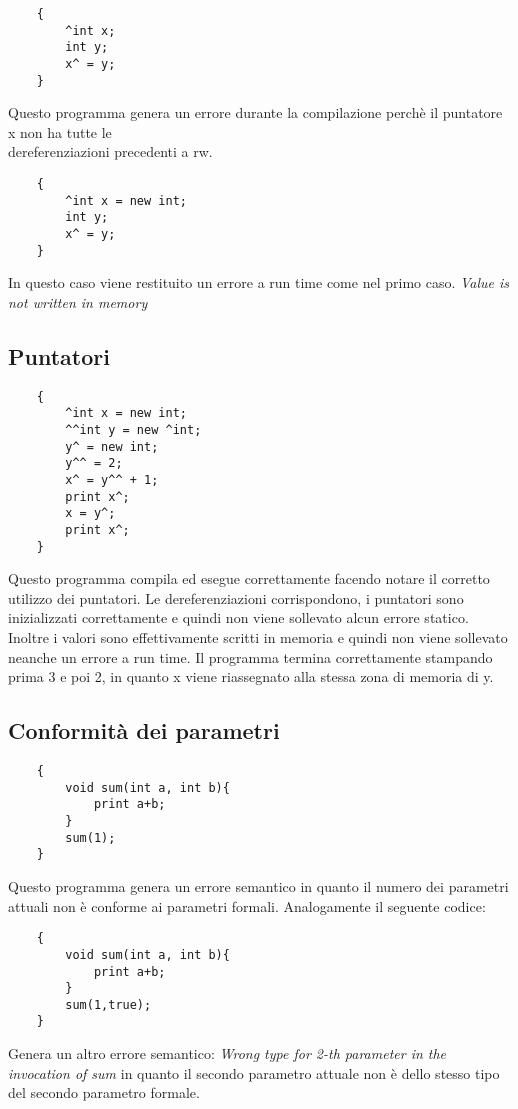 \documentclass[../../main]{subfiles}
\begin{document}
\begin{lstlisting}
    {
        ^int x;
        int y;
        x^ = y;
    }
\end{lstlisting}
Questo programma genera un errore durante la compilazione perchè il puntatore x non ha tutte le \\ dereferenziazioni
precedenti a rw.

\begin{lstlisting}
    {
        ^int x = new int;
        int y;
        x^ = y;
    }

\end{lstlisting}
In questo caso viene restituito un errore a run time come nel primo caso.
\textit{Value is not written in memory}

\subsection{Puntatori}
\begin{lstlisting}
    {
        ^int x = new int;
        ^^int y = new ^int;
        y^ = new int;
        y^^ = 2;
        x^ = y^^ + 1;
        print x^;
        x = y^;
        print x^;
    }
\end{lstlisting}
Questo programma compila ed esegue correttamente facendo notare il corretto utilizzo dei puntatori.
Le dereferenziazioni corrispondono, i puntatori sono inizializzati correttamente e quindi non viene sollevato 
alcun errore statico. Inoltre i valori sono effettivamente scritti in memoria e quindi non viene sollevato neanche un errore
a run time. Il programma termina correttamente stampando prima 3 e poi 2, in quanto x viene riassegnato alla stessa zona di memoria di y.

\subsection{Conformità dei parametri}
\begin{lstlisting}
    {
        void sum(int a, int b){
            print a+b;
        }
        sum(1);
    }
\end{lstlisting}
Questo programma genera un errore semantico in quanto il numero dei parametri attuali non è conforme ai parametri formali.
Analogamente il seguente codice:
\begin{lstlisting}
    {
        void sum(int a, int b){
            print a+b;
        }
        sum(1,true);
    }
\end{lstlisting}
Genera un altro errore semantico: \textit{Wrong type for 2-th parameter in the invocation of sum}
in quanto il secondo parametro attuale non è dello stesso tipo del secondo parametro formale.
\end{document}
